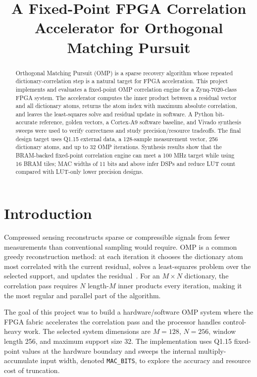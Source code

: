 \documentclass[onecolumn,conference]{IEEEtran}
\title{A Fixed-Point FPGA Correlation Accelerator for Orthogonal Matching Pursuit}
\author{
    \IEEEauthorblockN{ENGS 109 Final Project}
    \IEEEauthorblockA{Dartmouth College\\
    \texttt{engs109-omp-fpga}}
}
\begin{document}
\maketitle

\begin{abstract}
Orthogonal Matching Pursuit (OMP) is a sparse recovery algorithm whose repeated dictionary-correlation step is a natural target for FPGA acceleration. This project implements and evaluates a fixed-point OMP correlation engine for a Zynq-7020-class FPGA system. The accelerator computes the inner product between a residual vector and all dictionary atoms, returns the atom index with maximum absolute correlation, and leaves the least-squares solve and residual update in software. A Python bit-accurate reference, golden vectors, a Cortex-A9 software baseline, and Vivado synthesis sweeps were used to verify correctness and study precision/resource tradeoffs. The final design target uses Q1.15 external data, a 128-sample measurement vector, 256 dictionary atoms, and up to 32 OMP iterations. Synthesis results show that the BRAM-backed fixed-point correlation engine can meet a 100 MHz target while using 16 BRAM tiles; MAC widths of 11 bits and above infer DSPs and reduce LUT count compared with LUT-only lower precision designs.
\end{abstract}

\section{Introduction}
Compressed sensing reconstructs sparse or compressible signals from fewer measurements than conventional sampling would require. OMP is a common greedy reconstruction method: at each iteration it chooses the dictionary atom most correlated with the current residual, solves a least-squares problem over the selected support, and updates the residual~\cite{mallat,tropp}. For an $M \times N$ dictionary, the correlation pass requires $N$ length-$M$ inner products every iteration, making it the most regular and parallel part of the algorithm.

The goal of this project was to build a hardware/software OMP system where the FPGA fabric accelerates the correlation pass and the processor handles control-heavy work. The selected system dimensions are $M=128$, $N=256$, window length 256, and maximum support size 32. The implementation uses Q1.15 fixed-point values at the hardware boundary and sweeps the internal multiply-accumulate input width, denoted \texttt{MAC\_BITS}, to explore the accuracy and resource cost of truncation.
\end{document}
